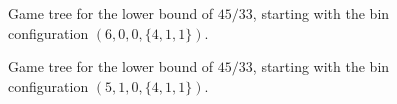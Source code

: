\clearpage

\begin{figure}[H]
\centering
{}%
\caption{Game tree for the lower bound of $45/33$, starting with the bin configuration $(6,0,0,\{4,1,1\})$.}
\end{figure}
\newpage

\begin{figure}[H]
\centering
{}%
\caption{Game tree for the lower bound of $45/33$, starting with the bin configuration $(5,1,0,\{4,1,1\})$.}
\end{figure}

